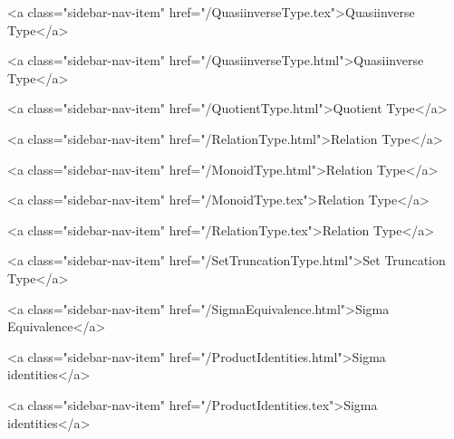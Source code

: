       
    
      
        
          <a class="sidebar-nav-item" href="/QuasiinverseType.tex">Quasiinverse Type</a>
        
      
    
      
        
          <a class="sidebar-nav-item" href="/QuasiinverseType.html">Quasiinverse Type</a>
        
      
    
      
        
          <a class="sidebar-nav-item" href="/QuotientType.html">Quotient Type</a>
        
      
    
      
        
          <a class="sidebar-nav-item" href="/RelationType.html">Relation Type</a>
        
      
    
      
        
          <a class="sidebar-nav-item" href="/MonoidType.html">Relation Type</a>
        
      
    
      
        
          <a class="sidebar-nav-item" href="/MonoidType.tex">Relation Type</a>
        
      
    
      
        
          <a class="sidebar-nav-item" href="/RelationType.tex">Relation Type</a>
        
      
    
      
        
          <a class="sidebar-nav-item" href="/SetTruncationType.html">Set Truncation Type</a>
        
      
    
      
        
          <a class="sidebar-nav-item" href="/SigmaEquivalence.html">Sigma Equivalence</a>
        
      
    
      
        
          <a class="sidebar-nav-item" href="/ProductIdentities.html">Sigma identities</a>
        
      
    
      
        
          <a class="sidebar-nav-item" href="/ProductIdentities.tex">Sigma identities</a>
        
